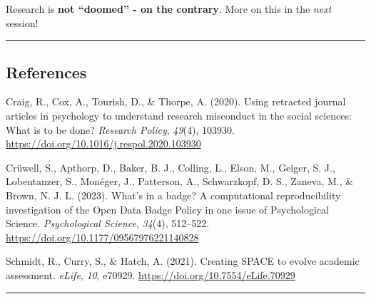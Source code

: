 \documentclass[
  english,
  letterpaper,
  DIV=11,
  numbers=noendperiod]{scrartcl}
\newlength{\cslhangindent}
\newenvironment{CSLReferences}[2] %
 {\begin{list}{}{%
  \setlength{\itemindent}{0pt}
  \setlength{\leftmargin}{0pt}
  \setlength{\parsep}{0pt}
  \ifodd #1
   \setlength{\leftmargin}{\cslhangindent}
   \setlength{\itemindent}{-1\cslhangindent}
  \fi
  \setlength{\itemsep}{#2\baselineskip}}}
 {\end{list}}
\begin{document}
\begin{tcolorbox}[enhanced jigsaw, arc=.35mm, bottomrule=.15mm, bottomtitle=1mm, breakable, colback=white, colbacktitle=quarto-callout-tip-color!10!white, colframe=quarto-callout-tip-color-frame, coltitle=black, left=2mm, leftrule=.75mm, opacityback=0, opacitybacktitle=0.6, rightrule=.15mm, title=\textcolor{quarto-callout-tip-color}{\faLightbulb}\hspace{0.5em}{Remember: There are solutions!}, titlerule=0mm, toprule=.15mm, toptitle=1mm]

Research is \textbf{not ``doomed'' - on the contrary}. More on this in
the \emph{next} session!

\end{tcolorbox}

\begin{center}\rule{0.5\linewidth}{0.5pt}\end{center}

\subsection{References}\label{references}

\protect{}\label{refs}
\begin{CSLReferences}{1}{0}
Craig, R., Cox, A., Tourish, D., \& Thorpe, A. (2020). Using retracted
journal articles in psychology to understand research misconduct in the
social sciences: {What} is to be done? \emph{Research Policy},
\emph{49}(4), 103930. \url{https://doi.org/10.1016/j.respol.2020.103930}

Crüwell, S., Apthorp, D., Baker, B. J., Colling, L., Elson, M., Geiger,
S. J., Lobentanzer, S., Monéger, J., Patterson, A., Schwarzkopf, D. S.,
Zaneva, M., \& Brown, N. J. L. (2023). What's in a badge? {A}
computational reproducibility investigation of the {Open Data Badge
Policy} in one issue of {Psychological Science}. \emph{Psychological
Science}, \emph{34}(4), 512--522.
\url{https://doi.org/10.1177/09567976221140828}

Schmidt, R., Curry, S., \& Hatch, A. (2021). Creating {SPACE} to evolve
academic assessment. \emph{eLife}, \emph{10}, e70929.
\url{https://doi.org/10.7554/eLife.70929}

\end{CSLReferences}

\begin{center}\rule{0.5\linewidth}{0.5pt}\end{center}
\end{document}

